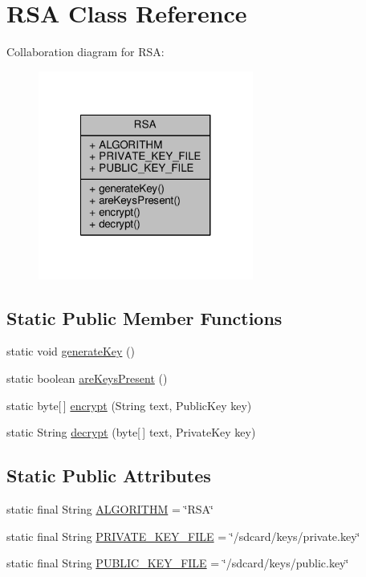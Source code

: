 \hypertarget{a00013}{\section{R\+S\+A Class Reference}
\label{a00013}
}


Collaboration diagram for R\+S\+A\+:
\nopagebreak
\begin{figure}[H]
\begin{center}
\leavevmode
\includegraphics[width=200pt]{a00072}
\end{center}
\end{figure}
\subsection*{Static Public Member Functions}
\begin{DoxyCompactItemize}
\item 
static void \hyperlink{a00013_a7e50cd7fa3c4f3a6817d292ca95aeb62}{generate\+Key} ()
\item 
static boolean \hyperlink{a00013_a35798da976b0b93c5a41d3cacfca2614}{are\+Keys\+Present} ()
\item 
static byte\mbox{[}$\,$\mbox{]} \hyperlink{a00013_aebcb755cdb5b80fbc7e5550d4ef7b58c}{encrypt} (String text, Public\+Key key)
\item 
static String \hyperlink{a00013_af45813b997c833a4aa7c740f24da405d}{decrypt} (byte\mbox{[}$\,$\mbox{]} text, Private\+Key key)
\end{DoxyCompactItemize}
\subsection*{Static Public Attributes}
\begin{DoxyCompactItemize}
\item 
static final String \hyperlink{a00013_a6e0d720a4420fd9bfd6749e43727e4cf}{A\+L\+G\+O\+R\+I\+T\+H\+M} = \char`\"{}R\+S\+A\char`\"{}
\item 
static final String \hyperlink{a00013_a6688acc9715053feb655fd1179f44ca2}{P\+R\+I\+V\+A\+T\+E\+\_\+\+K\+E\+Y\+\_\+\+F\+I\+L\+E} = \char`\"{}/sdcard/keys/private.\+key\char`\"{}
\item 
static final String \hyperlink{a00013_a9512d79dcc02d4b61268f7118479185d}{P\+U\+B\+L\+I\+C\+\_\+\+K\+E\+Y\+\_\+\+F\+I\+L\+E} = \char`\"{}/sdcard/keys/public.\+key\char`\"{}
\end{DoxyCompactItemize}


